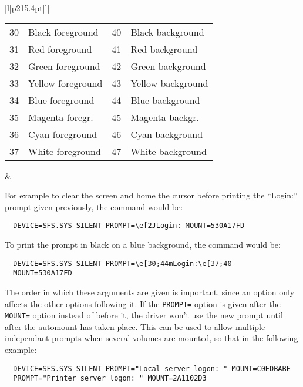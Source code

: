 \begin{center}
\begin{tabular}{|l|p{215.4pt}|l|}
	{\small \hyphenation{ fore-ground back-ground }
	\begin{tabular}{|r|p{73.5pt}|r|p{75.5pt}|}
	\hline 
                    30 & Black foreground   & 40 & Black background\\
                    31 & Red foreground     & 41 & Red background\\
                    32 & Green foreground   & 42 & Green background\\
                    33 & Yellow foreground  & 43 & Yellow background\\
                    34 & Blue foreground    & 44 & Blue background\\
                    35 & Magenta foregr.    & 45 & Magenta backgr.\\
                    36 & Cyan foreground    & 46 & Cyan background\\
                    37 & White foreground   & 47 & White background\\
	\hline
	\end{tabular} } & \\
\hline
\end{tabular}
\end{center}

For example to clear the screen and home the cursor before printing the
``Login:'' prompt given previously, the command would be:

\begin{verbatim}
  DEVICE=SFS.SYS SILENT PROMPT=\e[2JLogin: MOUNT=530A17FD
\end{verbatim}

To print the prompt in black on a blue background, the command would be:

\begin{verbatim}
  DEVICE=SFS.SYS SILENT PROMPT=\e[30;44mLogin:\e[37;40
  MOUNT=530A17FD
\end{verbatim}

The order in which these arguments are given is important, since an option only
affects the other options following it.  If the {\tt PROMPT=} option is given after 
the {\tt MOUNT=} option instead of before it, the driver won't use the new prompt 
until after the automount has taken place.  This can be used to allow multiple 
independant prompts when several volumes are mounted, so that in the following 
example:

{\tt \verb|  |DEVICE=SFS.SYS SILENT PROMPT="Local server logon:\ " MOUNT=C0EDBABE\\
     \verb|  |PROMPT="Printer server logon:\ " MOUNT=2A1102D3}

